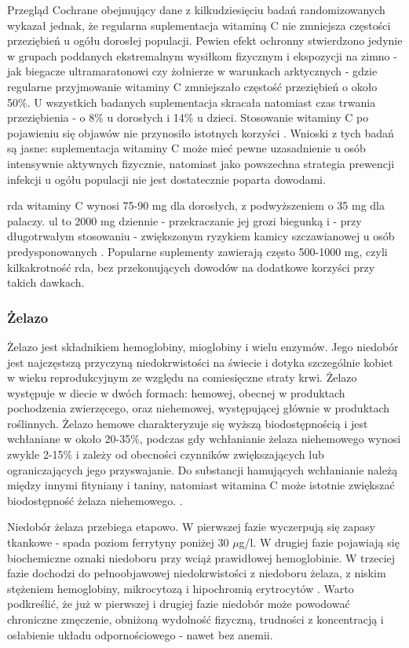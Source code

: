 Przegląd Cochrane obejmujący dane z kilkudziesięciu badań randomizowanych wykazał jednak, że regularna suplementacja witaminą C nie zmniejsza częstości przeziębień u ogółu dorosłej populacji. Pewien efekt ochronny stwierdzono jedynie w grupach poddanych ekstremalnym wysiłkom fizycznym i ekspozycji na zimno - jak biegacze ultramaratonowi czy żołnierze w warunkach arktycznych - gdzie regularne przyjmowanie witaminy C zmniejszało częstość przeziębień o około 50\%. U wszystkich badanych suplementacja skracała natomiast czas trwania przeziębienia - o 8\% u dorosłych i 14\% u dzieci. Stosowanie witaminy C po pojawieniu się objawów nie przynosiło istotnych korzyści \cite{hemila1996vitamin}. Wnioski z tych badań są jasne: suplementacja witaminy C może mieć pewne uzasadnienie u osób intensywnie aktywnych fizycznie, natomiast jako powszechna strategia prewencji infekcji u ogółu populacji nie jest dostatecznie poparta dowodami.

\gls{rda} witaminy C wynosi 75-90 mg dla dorosłych, z podwyższeniem o 35 mg dla palaczy. \gls{ul} to 2000 mg dziennie - przekraczanie jej grozi biegunką i - przy długotrwałym stosowaniu - zwiększonym ryzykiem kamicy szczawianowej u osób predysponowanych \cite{hemila1996vitamin}. Popularne suplementy zawierają często 500-1000 mg, czyli kilkakrotność \gls{rda}, bez przekonujących dowodów na dodatkowe korzyści przy takich dawkach.


\subsubsection{Żelazo}

Żelazo jest składnikiem hemoglobiny, mioglobiny i wielu enzymów. Jego niedobór jest najczęstszą przyczyną niedokrwistości na świecie i dotyka szczególnie kobiet w wieku reprodukcyjnym ze względu na comiesięczne straty krwi. Żelazo występuje w diecie w dwóch formach: hemowej, obecnej w produktach pochodzenia zwierzęcego, oraz niehemowej, występującej głównie w produktach roślinnych. Żelazo hemowe charakteryzuje się wyższą biodostępnością i jest wchłaniane w około 20-35\%, podczas gdy wchłanianie żelaza niehemowego wynosi zwykle 2-15\% i zależy od obecności czynników zwiększających lub ograniczających jego przyswajanie. Do substancji hamujących wchłanianie należą między innymi fityniany i taniny, natomiast witamina C może istotnie zwiększać biodostępność żelaza niehemowego. \cite{iolascon2024recommendations}.

Niedobór żelaza przebiega etapowo. W pierwszej fazie wyczerpują się zapasy tkankowe - spada poziom ferrytyny poniżej 30 $\mu$g/l. W drugiej fazie pojawiają się biochemiczne oznaki niedoboru przy wciąż prawidłowej hemoglobinie. W trzeciej fazie dochodzi do pełnoobjawowej niedokrwistości z niedoboru żelaza, z niskim stężeniem hemoglobiny, mikrocytozą i hipochromią erytrocytów \cite{iolascon2024recommendations}. Warto podkreślić, że już w pierwszej i drugiej fazie niedobór może powodować chroniczne zmęczenie, obniżoną wydolność fizyczną, trudności z koncentracją i osłabienie układu odpornościowego - nawet bez anemii.

